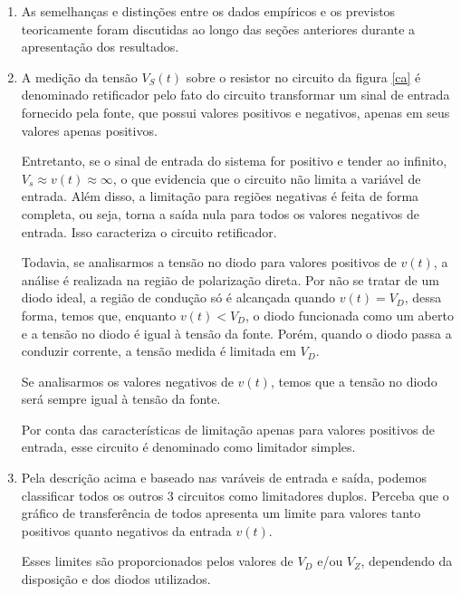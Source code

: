 \documentclass[10pt, final, a4paper]{IEEEtran} %
\begin{document}
\begin{enumerate}
\item As semelhanças e distinções entre os dados empíricos e os previstos teoricamente foram discutidas ao longo das seções anteriores durante a apresentação dos resultados.

\item A medição da tensão $V_S(t)$ sobre o resistor no circuito da figura \ref{ca} é denominado retificador pelo fato do circuito transformar um sinal de entrada fornecido pela fonte, que possui valores positivos e negativos, apenas em seus valores apenas positivos. 

Entretanto, se o sinal de entrada do sistema for positivo e tender ao infinito, $V_s \approx v(t) \approx \infty $, o que evidencia que o circuito não limita a variável de entrada. Além disso, a limitação para regiões negativas é feita de forma completa, ou seja, torna a saída nula para todos os valores negativos de entrada. Isso caracteriza o circuito retificador.

Todavia, se analisarmos a tensão no diodo para valores positivos de $v(t)$, a análise é realizada na região de polarização direta. Por não se tratar de um diodo ideal, a região de condução só é alcançada quando $v(t) = V_D$, dessa forma, temos que, enquanto $v(t) < V_D$, o diodo funcionada como um aberto e a tensão no diodo é igual à tensão da fonte. Porém, quando o diodo passa a conduzir corrente, a tensão medida é limitada em $V_D$.

Se analisarmos os valores negativos de $v(t)$, temos que a tensão no diodo será sempre igual à tensão da fonte.

Por conta das características de limitação apenas para valores positivos de entrada, esse circuito é denominado como limitador simples.

\item Pela descrição acima e baseado nas varáveis de entrada e saída, podemos classificar todos os outros 3 circuitos como limitadores duplos. Perceba que o gráfico de transferência de todos apresenta um limite para valores tanto positivos quanto negativos da entrada $v(t)$.

Esses limites são proporcionados pelos valores de $V_D$ e/ou $V_Z$, dependendo da disposição e dos diodos utilizados. 
\end{enumerate}


\end{document}
